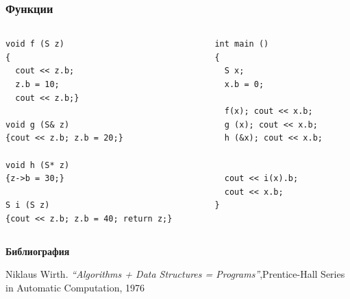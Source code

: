 \documentclass{beamer}
\begin{document}
\begin{frame}[fragile]
\frametitle{Функции} 


\begin{columns}[t]
  \begin{column}{0.6\textwidth}

\begin{flushleft}
\begin{lstlisting}
void f (S z)
{
  cout << z.b; 
  z.b = 10; 
  cout << z.b;}

void g (S& z)
{cout << z.b; z.b = 20;}

void h (S* z)
{z->b = 30;}

S i (S z)
{cout << z.b; z.b = 40; return z;}

\end{lstlisting}
\end{flushleft}
  \end{column}
  \begin{column}{0.4\textwidth}

\begin{flushleft}
\begin{lstlisting}
int main ()
{
  S x;
  x.b = 0;

  f(x); cout << x.b;
  g (x); cout << x.b;
  h (&x); cout << x.b;
  

  cout << i(x).b;
  cout << x.b;
}
\end{lstlisting}
\end{flushleft}


  \end{column}
\end{columns}



\end{frame}



\textbf {Библиография}
\begin{thebibliography}{9}

 Niklaus Wirth.  \emph{``Algorithms + Data Structures = Programs''},Prentice-Hall Series in Automatic Computation, 1976

\end{thebibliography}
\end{document}
